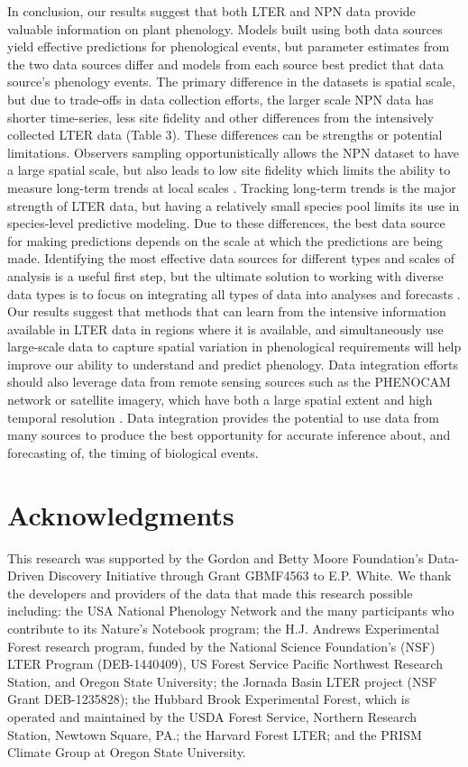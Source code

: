\documentclass[fleqn,12pt,lineno]{article}
\begin{document}
In conclusion, our results suggest that both LTER and NPN data provide valuable information on plant phenology. Models built using both data sources yield effective predictions for phenological events, but parameter estimates from the two data sources differ and models from each source best predict that data source's phenology events. The primary difference in the datasets is spatial scale, but due to trade-offs in data collection efforts, the larger scale NPN data has shorter time-series, less site fidelity and other differences from the intensively collected LTER data (Table 3). These differences can be strengths or potential limitations. Observers sampling opportunistically allows the NPN dataset to have a large spatial scale, but also leads to low site fidelity which limits the ability to measure long-term trends at local scales \citep{gerst2016}. Tracking long-term trends is the major strength of LTER data, but having a relatively small species pool limits its use in species-level predictive modeling. Due to these differences, the best data source for making predictions depends on the scale at which the predictions are being made. Identifying the most effective data sources for different types and scales of analysis is a useful first step, but the ultimate solution to working with diverse data types is to focus on integrating all types of data into analyses and forecasts \citep{hanks2018, melaas2016}. Our results suggest that methods that can learn from the intensive information available in LTER data in regions where it is available, and simultaneously use large-scale data to capture spatial variation in phenological requirements will help improve our ability to understand and predict phenology. Data integration efforts should also leverage data from remote sensing sources such as the PHENOCAM network or satellite imagery, which have both a large spatial extent and high temporal resolution \citep{richardson2018}. Data integration provides the potential to use data from many sources to produce the best opportunity for accurate inference about, and forecasting of, the timing of biological events.


\section*{Acknowledgments}

This research was supported by the Gordon and Betty Moore Foundation’s Data-Driven Discovery Initiative through Grant GBMF4563 to E.P. White. We thank the developers and providers of the data that made this research possible including: the USA National Phenology Network and the many participants who contribute to its Nature’s Notebook program; the H.J. Andrews Experimental Forest research program, funded by the National Science Foundation's (NSF) LTER Program (DEB-1440409), US Forest Service Pacific Northwest Research Station, and Oregon State University; the Jornada Basin LTER project (NSF Grant DEB-1235828); the Hubbard Brook Experimental Forest, which is operated and maintained by the USDA Forest Service, Northern Research Station, Newtown Square, PA.; the Harvard Forest LTER; and the PRISM Climate Group at Oregon State University.
\end{document}
